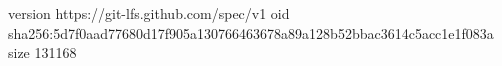 version https://git-lfs.github.com/spec/v1
oid sha256:5d7f0aad77680d17f905a130766463678a89a128b52bbac3614c5acc1e1f083a
size 131168
